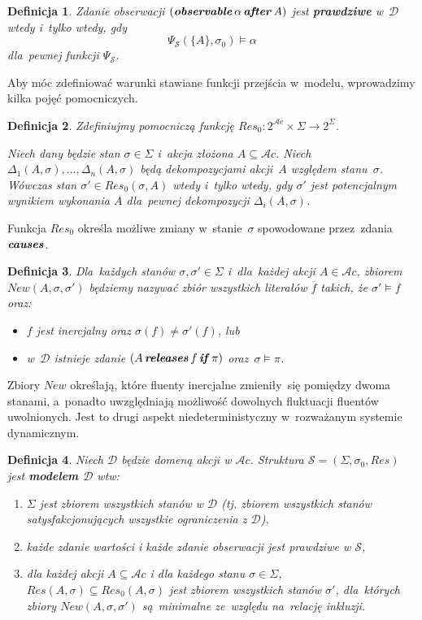 \documentclass[11pt,a4paper]{article}
\newtheorem{defn}{Definicja}
\DeclareMathOperator{\After}{\textbf{\textit{after}}}
\DeclareMathOperator{\Observable}{\textbf{\textit{observable}}}
\DeclareMathOperator{\Causes}{\textbf{\textit{causes}}}
\DeclareMathOperator{\If}{\textbf{\textit{if}}}
\DeclareMathOperator{\Releases}{\textbf{\textit{releases}}}
\begin{document}
\begin{defn}
    Zdanie obserwacji $(\Observable \alpha \After A)$ jest \textbf{prawdziwe} w~$\mathcal{D}$ wtedy i~tylko wtedy, gdy
    $$\Psi_{\mathcal{S}}(\{ A \}, \sigma_0) \models \alpha$$
    dla~pewnej funkcji $\Psi_{\mathcal{S}}$.
\end{defn}

Aby móc zdefiniować warunki stawiane funkcji przejścia w~modelu, wprowadzimy kilka pojęć pomocniczych.

\begin{defn}
    Zdefiniujmy pomocniczą funkcję $Res_0: 2^{\mathcal{A}c} \times \Sigma \rightarrow 2^\Sigma$.

    Niech dany będzie stan $\sigma \in \Sigma$ i~akcja złożona $A \subseteq \mathcal{A}c$.
    Niech $\Delta_1(A, \sigma), \dots, \Delta_n(A, \sigma)$ będą dekompozycjami akcji~$A$ względem stanu~$\sigma$.
    Wówczas stan $\sigma' \in Res_0(\sigma, A)$ wtedy i~tylko wtedy, gdy $\sigma'$ jest potencjalnym wynikiem wykonania $A$ dla~pewnej dekompozycji $\Delta_i(A, \sigma)$.
\end{defn}

Funkcja $Res_0$ określa możliwe zmiany w~stanie~$\sigma$ spowodowane przez~zdania $\Causes$.

\begin{defn}
    Dla~każdych stanów $\sigma, \sigma' \in \Sigma$ i~dla~każdej akcji $A \in \mathcal{A}c$, zbiorem $New(A, \sigma, \sigma')$ będziemy nazywać zbiór wszystkich literałów $\overline{f}$ takich, że $\sigma' \models f$ oraz:
    \begin{itemize}
        \item $f$ jest inercjalny oraz $\sigma(f) \neq \sigma'(f)$, lub
        \item w~$\mathcal{D}$ istnieje zdanie $(A \Releases f \If \pi)$ oraz~$\sigma \models \pi$.
    \end{itemize}
\end{defn}

Zbiory $New$ określają, które fluenty inercjalne zmieniły~się pomiędzy dwoma stanami, a~ponadto uwzględniają możliwość dowolnych fluktuacji fluentów uwolnionych.
Jest to drugi aspekt niedeterministyczny w~rozważanym systemie dynamicznym.

\begin{defn}
    Niech $\mathcal{D}$ będzie domeną akcji w $\mathcal{A}c$. Struktura $\mathcal{S} = (\Sigma,\sigma_0,Res)$ jest \textbf{modelem $\mathcal{D}$} wtw:
    \begin{enumerate}
    \item $\Sigma$ jest zbiorem wszystkich stanów w $\mathcal{D}$ (tj. zbiorem wszystkich stanów satysfakcjonujących wszystkie ograniczenia z $\mathcal{D}$),
    \item każde zdanie wartości i każde zdanie obserwacji jest prawdziwe w $\mathcal{S}$,
    \item dla każdej akcji $A \subseteq \mathcal{A}c$ i dla każdego stanu $\sigma \in \Sigma$, $Res(A,\sigma) \subseteq Res_0(A,\sigma)$ jest zbiorem wszystkich stanów $\sigma'$, dla~których zbiory $New(A,\sigma,\sigma')$ są~minimalne ze~względu na~relację inkluzji.
    \end{enumerate}
\end{defn}
\end{document}
